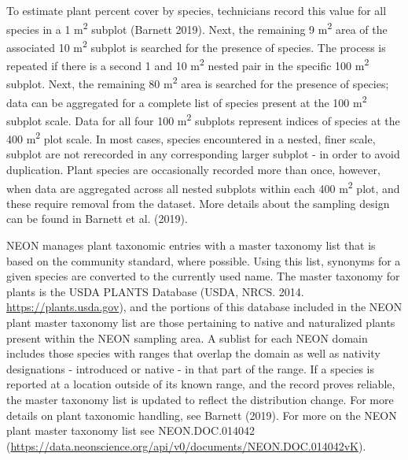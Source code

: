 \documentclass[
  12pt,
]{article}
\begin{document}
To estimate plant percent cover by species, technicians record this value for all species in a 1 m\textsuperscript{2} subplot (Barnett 2019). Next, the remaining 9 m\textsuperscript{2} area of the associated 10 m\textsuperscript{2} subplot is searched for the presence of species. The process is repeated if there is a second 1 and 10 m\textsuperscript{2} nested pair in the specific 100 m\textsuperscript{2} subplot. Next, the remaining 80 m\textsuperscript{2} area is searched for the presence of species; data can be aggregated for a complete list of species present at the 100 m\textsuperscript{2} subplot scale. Data for all four 100 m\textsuperscript{2} subplots represent indices of species at the 400 m\textsuperscript{2} plot scale. In most cases, species encountered in a nested, finer scale, subplot are not rerecorded in any corresponding larger subplot - in order to avoid duplication. Plant species are occasionally recorded more than once, however, when data are aggregated across all nested subplots within each 400 m\textsuperscript{2} plot, and these require removal from the dataset. More details about the sampling design can be found in Barnett et al. (2019).

NEON manages plant taxonomic entries with a master taxonomy list that is based on the community standard, where possible. Using this list, synonyms for a given species are converted to the currently used name. The master taxonomy for plants is the USDA PLANTS Database (USDA, NRCS. 2014. \url{https://plants.usda.gov}), and the portions of this database included in the NEON plant master taxonomy list are those pertaining to native and naturalized plants present within the NEON sampling area. A sublist for each NEON domain includes those species with ranges that overlap the domain as well as nativity designations - introduced or native - in that part of the range. If a species is reported at a location outside of its known range, and the record proves reliable, the master taxonomy list is updated to reflect the distribution change. For more details on plant taxonomic handling, see Barnett (2019). For more on the NEON plant master taxonomy list see NEON.DOC.014042 (\url{https://data.neonscience.org/api/v0/documents/NEON.DOC.014042vK}).
\end{document}
